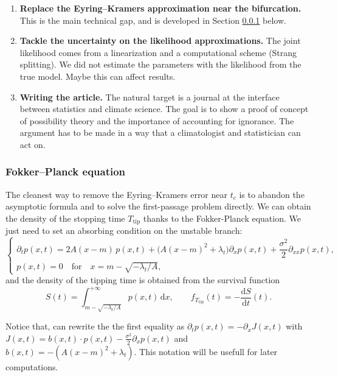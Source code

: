 \documentclass[12pt,a4paper]{article}
\theoremstyle{definition}
\theoremstyle{plain}
\newcommand{\dd}{\mathrm{d}}
\newcommand{\Ttip}{T_{\mathrm{tip}}}
\begin{document}
\begin{enumerate}
\item \textbf{Replace the Eyring--Kramers approximation near the bifurcation.} This is the main
technical gap, and is developed in Section \ref{sec:fp} below.

\item \textbf{Tackle the uncertainty on the likelihood approximations.} The joint likelihood comes from a linearization and a computational scheme (Strang splitting). We did not estimate the parameters with the likelihood from the true model. Maybe this can affect results. 

\item \textbf{Writing the article.} The natural target is a journal at the interface between statistics and
climate science. The goal is to show a proof of concept of possibility theory and the importance of accounting for ignorance.
The argument has to be made in a way that a climatologist and statistician can act on. \\
\end{enumerate}


\subsubsection{Fokker--Planck equation}
\label{sec:fp}

\noindent The cleanest way to remove the Eyring--Kramers error near $t_c$ is to abandon the asymptotic
formula and to solve the first-passage problem directly. We can obtain the density of the stopping time $\Ttip$ thanks to the Fokker-Planck equation. We just need to set an absorbing condition
on the unstable branch:
\begin{equation}
\label{eq:fp}
\begin{cases}
\partial_t p(x,t)=2A(x-m)\,p(x,t)+\big(A(x-m)^2+\lambda_t\big)\partial_x p(x,t)
+\dfrac{\sigma^2}{2}\partial_{xx}p(x,t),\\[8pt]
p(x,t)=0 \quad\text{for}\quad x=m-\sqrt{-\lambda_t/A},
\end{cases}
\end{equation}
and the density of the tipping time is obtained from the survival function
\begin{equation}
\label{eq:survival}
S(t)=\int_{m-\sqrt{-\lambda_t/A}}^{+\infty}p(x,t)\,\dd x,
\qquad f_{\Ttip}(t)=-\frac{\dd S}{\dd t}(t).
\end{equation}

\noindent Notice that, can rewrite the the first equality as $\partial_t p(x, t) = - \partial_x J(x,t)$ with $J(x, t)= b(x,t) \cdot p(x,t) - \frac{\sigma^2}{2} \partial_x p(x,t)$ and $b(x,t) = -(A(x-m)^2 + \lambda_t)$. This notation will be usefull for later computations.  \\
\end{document}
